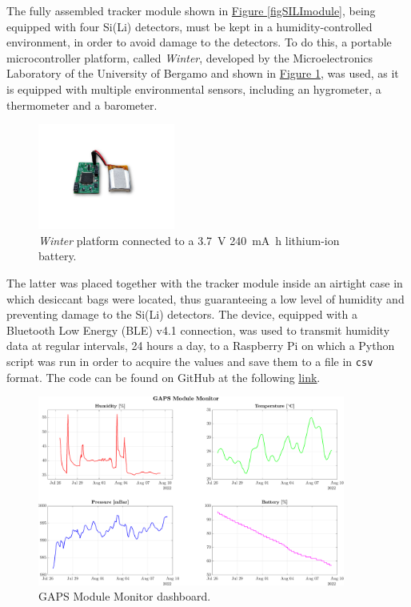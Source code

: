 \par
The fully assembled tracker module shown in \hyperref[figSILImodule]{Figure \ref{figSILImodule}}, being equipped with four Si(Li) detectors, must be kept in a humidity-controlled environment, in order to avoid damage to the detectors. To do this, a portable microcontroller platform, called \textit{Winter}, developed by the Microelectronics Laboratory of the University of Bergamo and shown in \hyperref[figWinterBattery]{Figure \ref{figWinterBattery}}, was used, as it is equipped with multiple environmental sensors, including an hygrometer, a thermometer and a barometer. 

\begin{figure}[h!]
    \centering
    \includegraphics[width=0.4\textwidth]{Images/chap3/winter_battery.pdf}
    \caption{\textit{Winter} platform connected to a \SI{3.7}{\volt} \SI{240}{\milli\ampere h} lithium-ion battery.}
    \label{figWinterBattery}
\end{figure}

\par
The latter was placed together with the tracker module inside an airtight case in which desiccant bags were located, thus guaranteeing a low level of humidity and preventing damage to the Si(Li) detectors. The device, equipped with a Bluetooth Low Energy (BLE) v4.1 connection, was used to transmit humidity data at regular intervals, 24 hours a day, to a Raspberry Pi on which a Python script was run in order to acquire the values and save them to a file in \texttt{csv} format. The code can be found on GitHub at the following \href{https://github.com/lucaghislo/winter_enviroment_monitor}{\underline{link}}. 

\begin{figure}[h!]
    \centering
    \includegraphics[width=0.9\textwidth]{Images/chap3/winter_plot.pdf} 
    \caption{GAPS Module Monitor dashboard.}
    \label{figWinterMATLABmonitor}
\end{figure}

